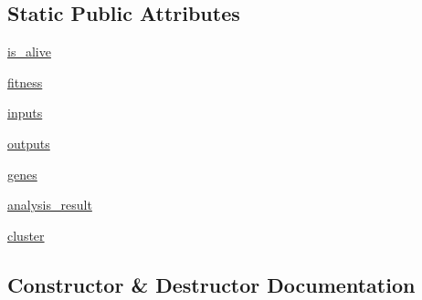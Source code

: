 \subsection*{Static Public Attributes}
\begin{DoxyCompactItemize}
\item 
\hyperlink{classNEAT__PyGenetics_1_1NEAT_1_1GenomeStructures_1_1StorageStructure_1_1StorageGenome_1_1StorageGenome_ae1e47996623ce538b3450f2415d57bc3}{is\+\_\+alive}
\item 
\hyperlink{classNEAT__PyGenetics_1_1NEAT_1_1GenomeStructures_1_1StorageStructure_1_1StorageGenome_1_1StorageGenome_a919c35fa0dfc5d4a81b008bef83c3ac9}{fitness}
\item 
\hyperlink{classNEAT__PyGenetics_1_1NEAT_1_1GenomeStructures_1_1StorageStructure_1_1StorageGenome_1_1StorageGenome_ad0bd7b5a391f6df7f56f60294fee0a00}{inputs}
\item 
\hyperlink{classNEAT__PyGenetics_1_1NEAT_1_1GenomeStructures_1_1StorageStructure_1_1StorageGenome_1_1StorageGenome_a69f429018a927d4919d4468054cf49ea}{outputs}
\item 
\hyperlink{classNEAT__PyGenetics_1_1NEAT_1_1GenomeStructures_1_1StorageStructure_1_1StorageGenome_1_1StorageGenome_a82003c70917d4c96053c6cea930383ce}{genes}
\item 
\hyperlink{classNEAT__PyGenetics_1_1NEAT_1_1GenomeStructures_1_1StorageStructure_1_1StorageGenome_1_1StorageGenome_a4ed1621581430cdf5791c33d1c2f6ac2}{analysis\+\_\+result}
\item 
\hyperlink{classNEAT__PyGenetics_1_1NEAT_1_1GenomeStructures_1_1StorageStructure_1_1StorageGenome_1_1StorageGenome_a4d31fdd32df12f7c1d9c6848b4ae1bcc}{cluster}
\end{DoxyCompactItemize}


\subsection{Constructor \& Destructor Documentation}
